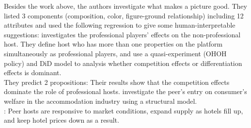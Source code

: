 \documentclass[12pt]{report}
\begin{document}
Besides the work above, the authors investigate what makes a picture good. They listed 3 components (composition, color, figure-ground relationship) including 12 attributes and used the
following regression to give some human-interpretable suggestions:
\cite{chen2023regulating} investigates the professional players' effects on the non-professional host. They define host who has more than
one properties on the platform simultaneously as professional players, and use a quasi-experiment (OHOH policy) and DiD model to analysis
whether competition effects or differentiation effects is dominant.\\
They predict 2 propositions:
Their results show that the competition effects dominate the role of professional hosts.
\cite{farronato2022welfare} investigate the peer's entry on consumer's welfare in the accommodation industry using a structural model.\\
: Peer hosts are responsive to market conditions, expand supply as hotels fill up, and keep hotel prices down as a result.
\end{document}
